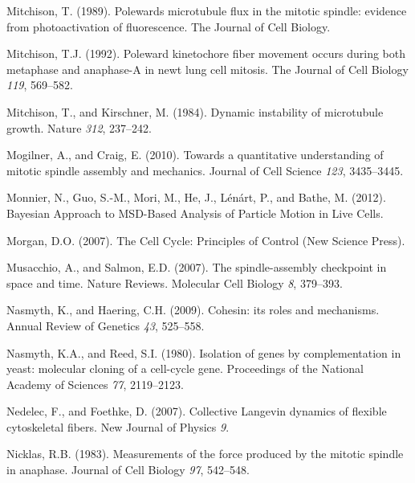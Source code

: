 \documentclass[12pt,a4paper,twoside,openright]{book}
\begin{document}
Mitchison, T. (1989). Polewards microtubule flux in the mitotic spindle:
evidence from photoactivation of fluorescence. The Journal of Cell
Biology.

Mitchison, T.J. (1992). Poleward kinetochore fiber movement occurs
during both metaphase and anaphase-A in newt lung cell mitosis. The
Journal of Cell Biology \emph{119}, 569--582.

Mitchison, T., and Kirschner, M. (1984). Dynamic instability of
microtubule growth. Nature \emph{312}, 237--242.

Mogilner, A., and Craig, E. (2010). Towards a quantitative understanding
of mitotic spindle assembly and mechanics. Journal of Cell Science
\emph{123}, 3435--3445.

Monnier, N., Guo, S.-M., Mori, M., He, J., Lénárt, P., and Bathe, M.
(2012). Bayesian Approach to MSD-Based Analysis of Particle Motion in
Live Cells.

Morgan, D.O. (2007). The Cell Cycle: Principles of Control (New Science
Press).

Musacchio, A., and Salmon, E.D. (2007). The spindle-assembly checkpoint
in space and time. Nature Reviews. Molecular Cell Biology \emph{8},
379--393.

Nasmyth, K., and Haering, C.H. (2009). Cohesin: its roles and
mechanisms. Annual Review of Genetics \emph{43}, 525--558.

Nasmyth, K.A., and Reed, S.I. (1980). Isolation of genes by
complementation in yeast: molecular cloning of a cell-cycle gene.
Proceedings of the National Academy of Sciences \emph{77}, 2119--2123.

Nedelec, F., and Foethke, D. (2007). Collective Langevin dynamics of
flexible cytoskeletal fibers. New Journal of Physics \emph{9}.

Nicklas, R.B. (1983). Measurements of the force produced by the mitotic
spindle in anaphase. Journal of Cell Biology \emph{97}, 542--548.
\end{document}
